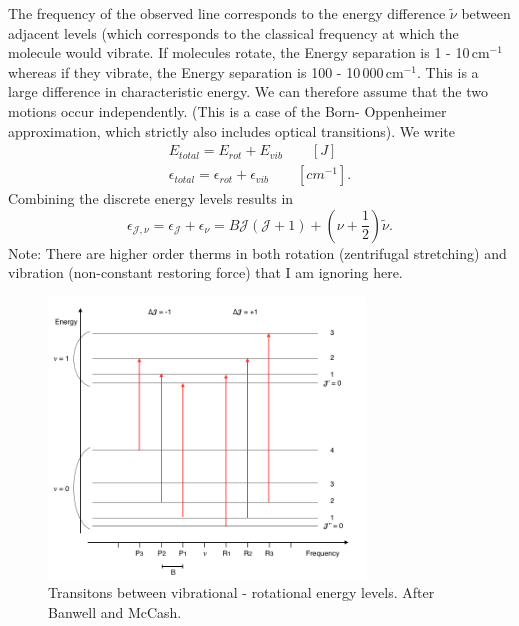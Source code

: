 The frequency of the observed line corresponds to the energy
difference $\tilde{\nu}$ between adjacent levels (which corresponds to
the classical frequency at which the molecule would vibrate. If
molecules rotate, the Energy separation is 1 - 10\,cm$^{-1}$ whereas
if they vibrate, the Energy separation is 100 -
10\,000\,cm$^{-1}$. This is a large difference in characteristic
energy. We can therefore assume that the two motions occur
independently.  (This is a case of the Born- Oppenheimer
approximation, which strictly also includes optical transitions). We
write
 \begin{gather}
E_{total} = E_{rot} + E_{vib} \qquad \left[J\right]  \\
\epsilon_{total} = \epsilon_{rot} + \epsilon_{vib} \qquad \left[cm^{-1}\right].
 \end{gather}
Combining the discrete energy levels results in
\begin{equation}
\epsilon_{\mathcal{J},\nu} = \epsilon_{\mathcal{J}} + \epsilon_{\nu} = B \mathcal{J} (\mathcal{J} + 1) + (\nu + \frac{1}{2})\tilde{\nu}.
\end{equation}
Note: There are higher order therms in both rotation (zentrifugal stretching) and vibration (non-constant restoring force) that I am ignoring here. \par
 
 \begin{figure}
\begin{center}
\includegraphics[width=0.75\textwidth]{figures/Transitions_vib_rot}
\caption{Transitons between vibrational - rotational energy levels. After Banwell and McCash.}
\label{Transitions_vib_rot}
\end{center}
\end{figure}
 
